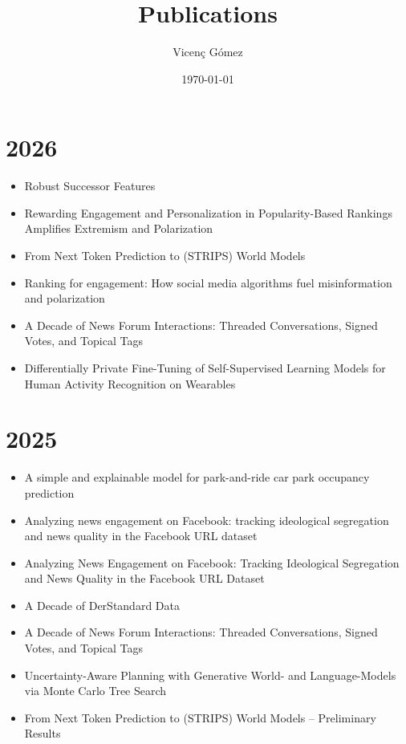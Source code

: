 \documentclass{article}
\title{Publications}
\author{Vicen\c{c} G\'omez}
\date{\today}
\begin{document}
\maketitle

\section*{2026}
\begin{itemize}
\item Robust Successor Features~\cite{nikulski2026robust}
\item Rewarding Engagement and Personalization in Popularity-Based Rankings Amplifies Extremism and Polarization~\cite{KDD2026}
\item From Next Token Prediction to (STRIPS) World Models~\cite{KR2026-101}
\item Ranking for engagement: How social media algorithms fuel misinformation and polarization~\cite{GERMANO2026105589}
\item A Decade of News Forum Interactions: Threaded Conversations, Signed Votes, and Topical Tags~\cite{fraxanetDecadeNewsForum2026}
\item Differentially Private Fine-Tuning of Self-Supervised Learning Models for Human Activity Recognition on Wearables~\cite{10.1007/978-3-032-16708-8_1}
\end{itemize}

\section*{2025}
\begin{itemize}
\item A simple and explainable model for park-and-ride car park occupancy prediction~\cite{kaltenbrunner2025EPJ}
\item Analyzing news engagement on Facebook: tracking ideological segregation and news quality in the Facebook URL dataset~\cite{fraxanet-EPJ25}
\item Analyzing News Engagement on Facebook: Tracking Ideological Segregation and News Quality in the Facebook URL Dataset~\cite{fraxanet-ic2s2-2025a}
\item A Decade of DerStandard Data~\cite{fraxanet-ic2s2-2025b}
\item A Decade of News Forum Interactions: Threaded Conversations, Signed Votes, and Topical Tags~\cite{P32CXW_2025}
\item Uncertainty-Aware Planning with Generative World- and Language-Models via Monte Carlo Tree Search~\cite{dalmau-moreno2026uncertaintyaware}
\item From Next Token Prediction to (STRIPS) World Models – Preliminary Results~\cite{nunez-molina2025from}
\end{itemize}
\end{document}
